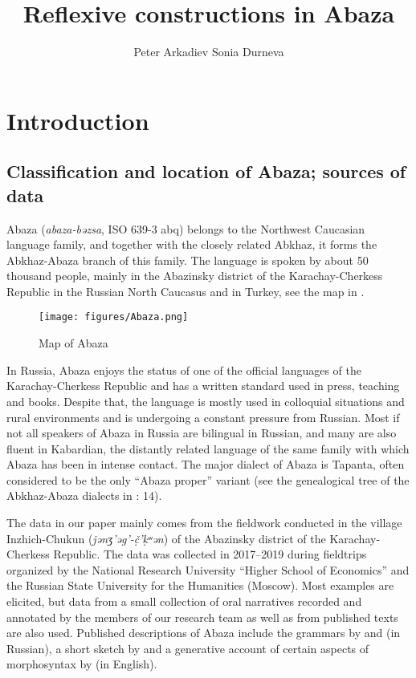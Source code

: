\documentclass[output=paper]{langscibook}
\author{Peter Arkadiev\affiliation{Institute of Slavic Studies of the Russian Academy of Sciences, Russian State University for the Humanities} \lastand Sonia Durneva\affiliation{Higher School of Economics, Moscow}}
\title{Reflexive constructions in Abaza}
\begin{document}
\maketitle 




\section{Introduction}\label{sec:Arkadiev:1}

\subsection{Classification and location of Abaza; sources of data}\label{sec:Arkadiev:1.1}



Abaza (\textit{abaza-b{ə}zsa}, ISO 639-3 abq) belongs to the Northwest Caucasian language family, and together with the closely related Abkhaz, it forms the Abkhaz-Abaza branch of this family. The language is spoken by about 50 thousand people, mainly in the Abazinsky district of the Karachay-Cherkess Republic in the Russian North Caucasus and in Turkey, see the map in . 



\begin{figure}
\texttt{[image: figures/Abaza.png]}
\caption{Map of Abaza}
\label{fig:Arkadiev:1}
\end{figure}


In Russia, Abaza enjoys the status of one of the official languages of the Karachay-Cherkess Republic and has a written standard used in press, teaching and books. Despite that, the language is mostly used in colloquial situations and rural environments and is undergoing a constant pressure from Russian. Most if not all speakers of Abaza in Russia are bilingual in Russian, and many are also fluent in Kabardian, the distantly related language of the same family with which Abaza has been in intense contact. The major dialect of Abaza is Tapanta, often considered to be the only “Abaza proper” variant (see the genealogical tree of the Abkhaz-Abaza dialects in \citealt{Chirikba2003}: 14).



The data in our paper mainly comes from the fieldwork conducted in the village Inzhich-Chukun (\textit{j{ə}n{ʒ}’{ə}g’-č{̣}’k{̣}{ʷ}{ə}n}) of the Abazinsky district of the Karachay-Cherkess Republic. The data was collected in 2017–2019 during fieldtrips organized by the National Research University “Higher School of Economics” and the Russian State University for the Humanities (Moscow). Most examples are elicited, but data from a small collection of oral narratives recorded and annotated by the members of our research team as well as from published texts are also used. Published descriptions of Abaza include the grammars by \citet{Genko1955} and \citet{Tabulova1976} (in Russian), a short sketch by \citet{LomtatidzeHewitt1989} and a generative account of certain aspects of morphosyntax by \citet{OHerin2002} (in English).
\end{document}
